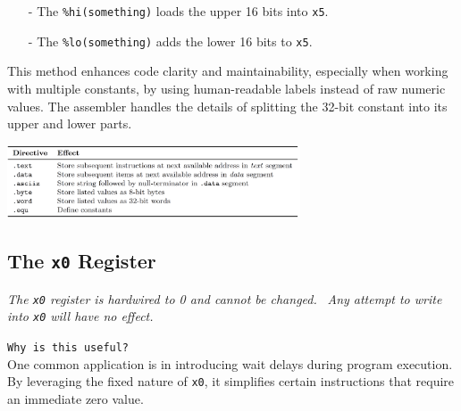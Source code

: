 \begin{itemize}
    \item[-] The \texttt{\%hi(something)} loads the upper 16 bits into \texttt{x5}.
    \item[-] The \texttt{\%lo(something)} adds the lower 16 bits to \texttt{x5}.
\end{itemize}

This method enhances code clarity and maintainability, especially when working with multiple constants, by using human-readable labels instead of raw numeric values. The assembler handles the details of splitting the 32-bit constant into its upper and lower parts.
\begin{center} \includegraphics[width=0.65\textwidth]{chapters/chapter1b/images/directives2.png} \end{center}

\subsection{The \texttt{x0} Register} 
\textit{The \texttt{x0} register is hardwired to 0 and cannot be changed.} \ \textit{Any attempt to write into \texttt{x0} will have no effect.}

\texttt{Why is this useful?} \\
One common application is in introducing wait delays during program execution. By leveraging the fixed nature of \texttt{x0}, it simplifies certain instructions that require an immediate zero value.

